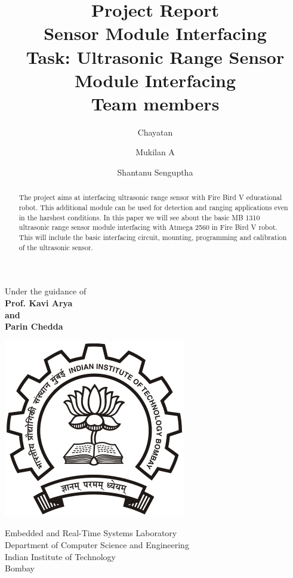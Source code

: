 \documentclass[a4paper,29.6pt]{article}
\title {Project Report \\ Sensor Module Interfacing \\[10pt] Task: Ultrasonic Range Sensor Module Interfacing \\[25pt] Team members }
\author {Chayatan \and Mukilan A \and Shantanu Senguptha}
\begin{document}
\maketitle
\begin{center}
\begin{large}
Under the guidance of\\
\textbf{Prof. Kavi Arya\\and\\Parin Chedda}\\
\vspace{0.5in}
\end{large}
\end{center}
\begin{center}
\includegraphics[scale=0.32]{images/iitb}
\end{center}
\begin{center}
\begin{large}
Embedded and Real-Time Systems Laboratory \\
Department of Computer Science and Engineering \\
Indian Institute of Technology \\
Bombay \\
\end{large}
\end{center}

\newpage
\tableofcontents
\newpage

\begin{abstract}
The project aims at interfacing ultrasonic range sensor with Fire Bird V educational robot. This additional module can be used for detection and ranging applications even in the harshest conditions. In this paper we will see about the basic MB 1310 ultrasonic range sensor module interfacing with Atmega 2560 in Fire Bird V robot. This will include the basic interfacing circuit, mounting, programming and calibration of the ultrasonic sensor.  
\end{abstract}
\end{document}
